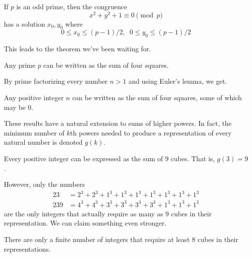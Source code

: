 \documentclass{article}
\newcounter{theorem}[section]
\begin{document}
\begin{lemma}
  \label{thm:solvability-of-x2y21equiv0pmodp}
If $p$ is an odd prime, then the congruence 
\begin{equation}
  x^2 + y^2 + 1 \equiv 0 \pmod{p}
\end{equation}
has a solution $x_0, y_0$ where 
\begin{equation}
  0 \leq x_0 \leq (p-1)/2, \;\; 0 \leq y_0 \leq (p-1)/2
\end{equation}
\end{lemma}

This leads to the theorem we've been waiting for. 

\begin{theorem}
  \label{thm:every-prime-is-a-sum-of-four-squares}
Any prime $p$ can be written as the sum of four squares. 
\end{theorem}

By prime factorizing every number $n>1$ and using Euler's lemma, we get. 

\begin{corollary}[Lagrange]
  \label{thm:lagrange-2}
Any positive integer $n$ can be written as the sum of four squares, some of which may be $0$. 
\end{corollary}

These results have a natural extension to sums of higher powers. In fact, the minimum number of $k$th powers needed to produce a representation of every natural number is denoted $g(k)$. 

\begin{theorem}
  \label{thm:warings-problem-for-cubes}
Every positive integer can be expressed as the sum of $9$ cubes. That is, $g(3) = 9$. 
\end{theorem}

However, only the numbers
\begin{align*}
    23 & = 2^3 + 2^3 + 1^3 + 1^3 + 1^3 + 1^3 + 1^3 + 1^3 + 1^3 \\
    239 & = 4^3 + 4^3 + 3^3+ 3^3 + 3^3 + 3^3 + 1^3 + 1^3 + 1^3 
\end{align*}
are the only integers that actually require as many as $9$ cubes in their representation. We can claim something even stronger.

\begin{theorem}[Linnik]
  \label{thm:linnik}
There are only a finite number of integers that require at least $8$ cubes in their representations. 
\end{theorem}
\end{document}
